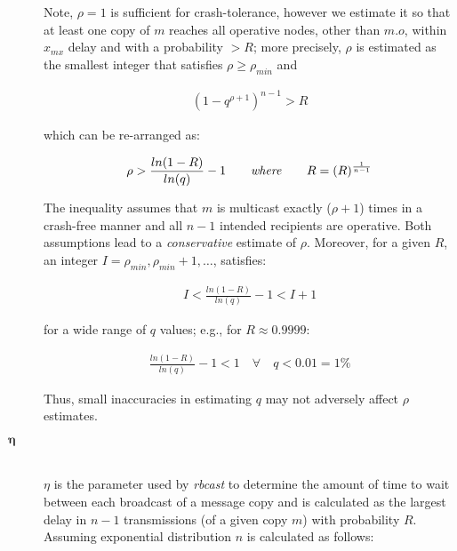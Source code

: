 \begin{description}
        Note, $\rho = 1$ is sufficient for crash-tolerance, however we estimate it so that at least one copy of $m$ reaches all operative nodes, other than $m.o$, within $x_{mx}$ delay and with a probability $> R$; more precisely, $\rho$ is estimated as the smallest integer that satisfies $\rho \geq \rho_{min}$ and

        \begin{equation*}
            \begin{aligned}
                (1-q^{\rho+1})^{n-1} > R
            \end{aligned}
        \end{equation*}

        which can be re-arranged as:

        \begin{equation*}
            \begin{aligned}
                \rho > \frac{ln(1-R)}{ln(q)} -1 \qquad \mbox{\emph{where}} \qquad R=(R)^{\frac{1}{n-1}}
            \end{aligned}
        \end{equation*}

        The inequality assumes that $m$ is multicast exactly ($\rho +1$) times in a crash-free manner and all $n-1$  intended recipients are operative. Both assumptions lead to a \emph{conservative} estimate of $\rho$. Moreover, for a given $R$, an integer $I =\rho_{min}, \rho_{min} + 1, \ldots$, satisfies: 

        \begin{equation*}
            \begin{aligned}
                I < \frac{ln(1-R)}{ln(q)}-1 < I+1
            \end{aligned}
        \end{equation*}
        
        for a wide range of $q$ values; e.g., for $R \approx 0.9999$:

        \begin{equation*}
            \begin{aligned}
                \frac{ln(1-R)}{ln(q)}-1 < 1 \quad \forall \quad q < 0.01 = 1\%
            \end{aligned}
        \end{equation*}

        Thus, small inaccuracies in estimating $q$ may not adversely affect $\rho$ estimates.  

        \item[\Huge$\boldsymbol{\eta}$] \hfill \\
        $\eta$ is the parameter used by \emph{rbcast} to determine the amount of time to wait between each broadcast of a message copy and is calculated as the largest delay in $n - 1$ transmissions (of a given copy $m$) with probability $R$.  Assuming exponential distribution $n$ is calculated as follows:
        

\end{description}
